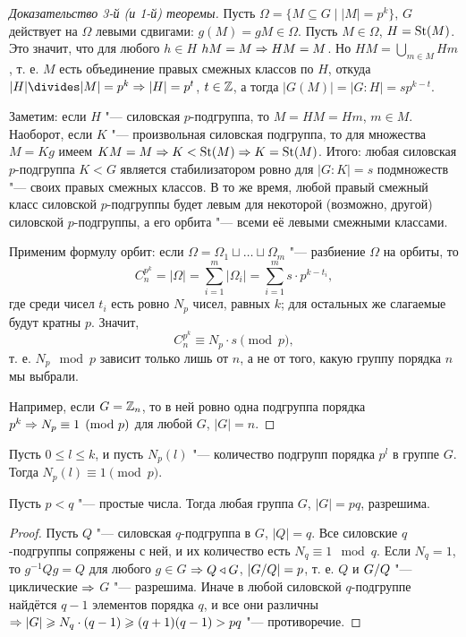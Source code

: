 \documentclass[main]{subfiles}
\begin{document}
\begin{proof}[Доказательство 3-й (и 1-й) теоремы]
  Пусть $\Omega = \{ M \subseteq G \mid |M| = p^k \}$,
  $G$ действует на $\Omega$ левыми сдвигами:
  $g(M) = gM \in \Omega$.
  Пусть $M \in \Omega$, $H = \operatorname{St}(M)$.
  Это значит, что для любого $h \in H$
  $hM = M \Rightarrow H M = M$.
  Но $HM = \bigcup_{m \in M} Hm$, т. е.
  $M$ есть объединение правых смежных классов по $H$,
  откуда $|H| \divides |M| = p^k \To |H| = p^t$, $t \in \mathbb{Z}$,
  а тогда $|G(M)| = |G : H| = s p^{k - t}$.

  Заметим: если $H$ "--- силовская $p$-подгруппа, то $M = HM = Hm$,
  $m \in M$. Наоборот, если $K$ "--- произвольная силовская подгруппа, то
  для множества $M = Kg$ имеем $KM = M \Rightarrow K < \operatorname{St}(M) \Rightarrow K = \operatorname{St}(M)$.
  Итого: любая силовская $p$-подгруппа $K < G$ является стабилизатором ровно для
  $|G : K| = s$ подмножеств "--- своих правых смежных классов.
  В то же время, любой правый смежный класс
  силовской \( p \)-подгруппы
  будет левым для некоторой (возможно, другой)
  силовской \( p \)-подгруппы,
  а его орбита "--- всеми её левыми смежными классами.

  Применим формулу орбит:
  если $\Omega = \Omega_1 \sqcup \dots \sqcup \Omega_m$ "---
  разбиение \( \Omega \) на орбиты, то
  \[
    C_n^{p^k} = |\Omega| = \sum_{i = 1}^m |\Omega_i| =
    \sum_{i = 1}^m s \cdot p^{k - t_i},
  \]
  где среди чисел $t_i$ есть
  ровно $N_p$ чисел, равных $k$;
  для остальных же
  слагаемые будут кратны \( p \).
  Значит,
  $$C_n^{p^k} \equiv N_p \cdot s \pmod{p},$$
  т. е.  $N_p \mod p$ зависит только лишь от $n$,
  а не от того,
  какую группу порядка \( n \) мы выбрали.

  Например, если $G = \mathbb{Z}_n$,
  то в ней ровно одна подгруппа порядка $p^k
  \Rightarrow N_p \equiv 1 \pmod{p}$ для любой $G$,
  $|G| = n$.
\end{proof}

\begin{exercise}
  Пусть $0 \le l \le k$,
  и пусть $N_p(l)$ "--- количество
  подгрупп порядка $p^l$ в группе $G$.
  Тогда $N_p(l) \equiv 1 \pmod{p}$.
\end{exercise}

\begin{proposition}
  Пусть $p < q$ "--- простые числа. Тогда любая группа
  $G$, $|G| = pq$, разрешима.
\end{proposition}
\begin{proof}
  Пусть $Q$ "--- силовская $q$-подгруппа в $G$, $|Q| = q$.
  Все силовские $q$-подгруппы сопряжены с ней,
  и их количество есть $N_q \equiv 1 \mod{q}$.
  Если $N_q = 1$, то $g^{-1} Q g = Q$ для любого $g \in G$
  $\Rightarrow Q \triangleleft G$, $|\Factor{G}[Q]| = p$, т. е. $Q$ и $\Factor{G}[Q]$ "--- циклические
  $\Rightarrow$ $G$ "--- разрешима. Иначе в любой силовской $q$-подгруппе
  найдётся $q - 1$ элементов порядка $q$, и все они различны
  $\Rightarrow |G| \geqslant N_q \cdot (q - 1) \geqslant (q + 1)(q - 1) > pq$ "---
  противоречие.
\end{proof}
\end{document}
